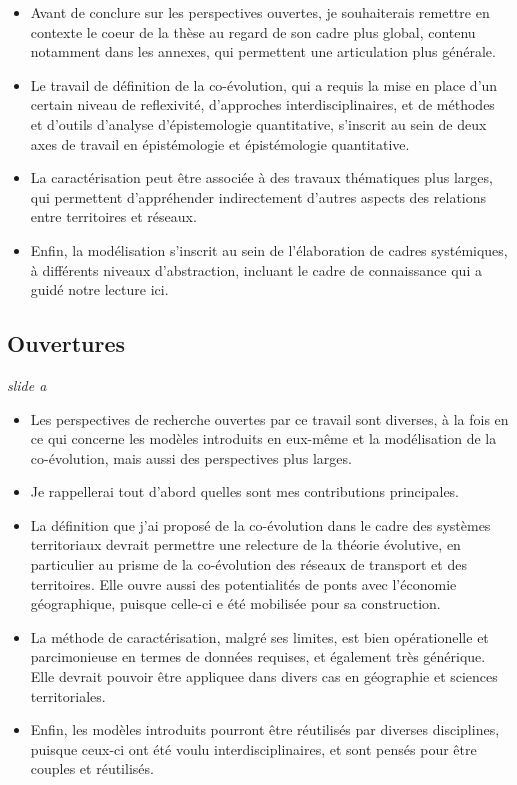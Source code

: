\documentclass[12pt]{article}
\begin{document}
\begin{itemize}
	\item Avant de conclure sur les perspectives ouvertes, je souhaiterais remettre en contexte le coeur de la thèse au regard de son cadre plus global, contenu notamment dans les annexes, qui permettent une articulation plus générale.
	\item Le travail de définition de la co-évolution, qui a requis la mise en place d'un certain niveau de reflexivité, d'approches interdisciplinaires, et de méthodes et d'outils d'analyse d'épistemologie quantitative, s'inscrit au sein de deux axes de travail en épistémologie et épistémologie quantitative.
	\item La caractérisation peut être associée à des travaux thématiques plus larges, qui permettent d'appréhender indirectement d'autres aspects des relations entre territoires et réseaux.
	\item Enfin, la modélisation s'inscrit au sein de l'élaboration de cadres systémiques, à différents niveaux d'abstraction, incluant le cadre de connaissance qui a guidé notre lecture ici.
\end{itemize}


\newpage

\subsection*{Ouvertures}

\textit{slide a}

\begin{itemize}
	\item Les perspectives de recherche ouvertes par ce travail sont diverses, à la fois en ce qui concerne les modèles introduits en eux-même et la modélisation de la co-évolution, mais aussi des perspectives plus larges.
	\item Je rappellerai tout d'abord quelles sont mes contributions principales.
	\item La définition que j'ai proposé de la co-évolution dans le cadre des systèmes territoriaux devrait permettre une relecture de la théorie évolutive, en particulier au prisme de la co-évolution des réseaux de transport et des territoires. Elle ouvre aussi des potentialités de ponts avec l'économie géographique, puisque celle-ci e été mobilisée pour sa construction.
	\item La méthode de caractérisation, malgré ses limites, est bien opérationelle et parcimonieuse en termes de données requises, et également très générique. Elle devrait pouvoir être appliquee dans divers cas en géographie et sciences territoriales.
	\item Enfin, les modèles introduits pourront être réutilisés par diverses disciplines, puisque ceux-ci ont été voulu interdisciplinaires, et sont pensés pour être couples et réutilisés.
\end{itemize}
\end{document}
